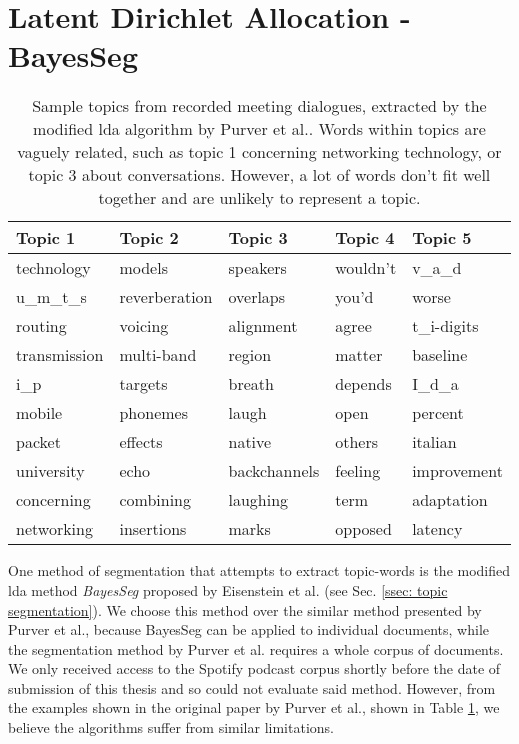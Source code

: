 \section[LDA BayesSeg]{Latent Dirichlet Allocation - BayesSeg \label{method: LDA}}
    \begin{table}
    \centering
    \begin{tabular}{lllll}
    \hline
    \textbf{Topic 1}   & \textbf{Topic 2}    & \textbf{Topic 3}   & \textbf{Topic 4} & \textbf{Topic 5}  \\ \hline
    technology   & models        & speakers     & wouldn't   & v\_a\_d     \\
    u\_m\_t\_s   & reverberation & overlaps     & you'd      & worse       \\
    routing      & voicing       & alignment    & agree      & t\_i-digits \\
    transmission & multi-band    & region       & matter     & baseline    \\
    i\_p         & targets       & breath       & depends    & I\_d\_a     \\
    mobile       & phonemes      & laugh        & open       & percent     \\
    packet       & effects       & native       & others     & italian     \\
    university   & echo          & backchannels & feeling    & improvement \\
    concerning   & combining     & laughing     & term       & adaptation  \\
    networking   & insertions    & marks        & opposed    & latency     \\ \hline
    \end{tabular}
    \caption{Sample topics from recorded meeting dialogues, extracted by the modified \gls{lda} algorithm by Purver et al.\cite{purver2006unsupervised}. Words within topics are vaguely related, such as topic 1 concerning networking technology, or topic 3 about conversations. However, a lot of words don't fit well together and are unlikely to represent a topic.}
    \label{table: modified lda topics}
    \end{table}

    One method of segmentation that attempts to extract topic-words is the modified \gls{lda} method \textit{BayesSeg} proposed by Eisenstein et al.\cite{eisenstein2008bayesian} (see Sec. \ref{ssec: topic segmentation}). We choose this method over the similar method presented by Purver et al.\cite{purver2006unsupervised}, because BayesSeg can be applied to individual documents, while the segmentation method by Purver et al. requires a whole corpus of documents. We only received access to the Spotify podcast corpus shortly before the date of submission of this thesis and so could not evaluate said method. However, from the examples shown in the original paper by Purver et al.\cite{purver2006unsupervised}, shown in Table \ref{table: modified lda topics}, we believe the algorithms suffer from similar limitations.

